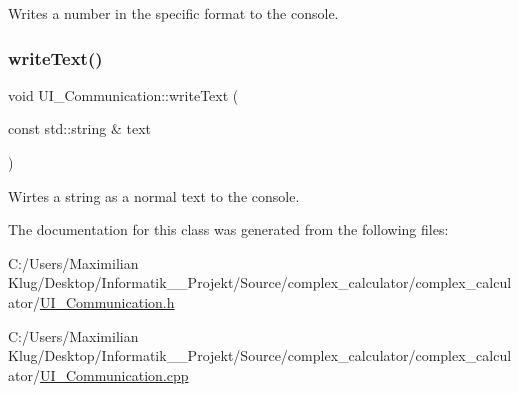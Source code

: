 Writes a number in the specific format to the console. 

\mbox{\label{class_u_i___communication_a2a5e6618db73c2db5b8d12a6270dd8c1}} 
\subsubsection{\texorpdfstring{write\+Text()}{writeText()}}
{\footnotesize\ttfamily void U\+I\+\_\+\+Communication\+::write\+Text (\begin{DoxyParamCaption}\item[{const std\+::string \&}]{text }\end{DoxyParamCaption})}



Wirtes a string as a normal text to the console. 



The documentation for this class was generated from the following files\+:\begin{DoxyCompactItemize}
\item 
C\+:/\+Users/\+Maximilian Klug/\+Desktop/\+Informatik\+\_\+\_\+\+Projekt/\+Source/complex\+\_\+calculator/complex\+\_\+calculator/\mbox{\hyperlink{_u_i___communication_8h}{U\+I\+\_\+\+Communication.\+h}}\item 
C\+:/\+Users/\+Maximilian Klug/\+Desktop/\+Informatik\+\_\+\_\+\+Projekt/\+Source/complex\+\_\+calculator/complex\+\_\+calculator/\mbox{\hyperlink{_u_i___communication_8cpp}{U\+I\+\_\+\+Communication.\+cpp}}\end{DoxyCompactItemize}
